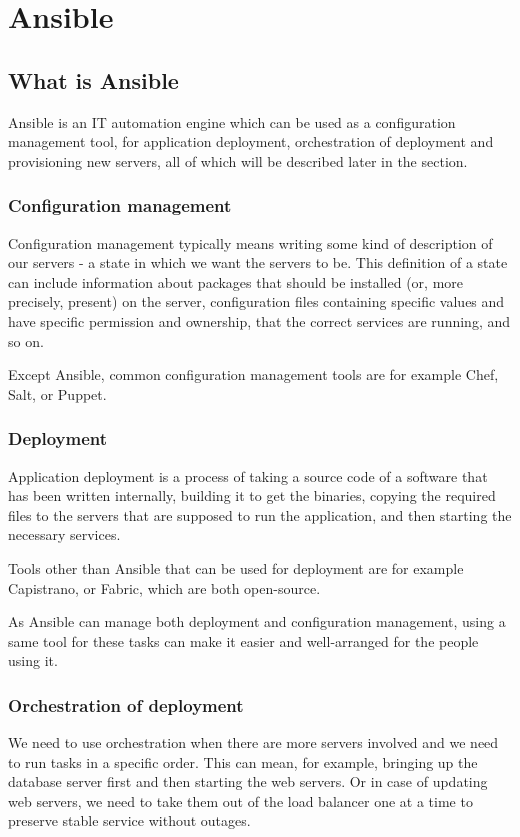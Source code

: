 \section{Ansible}

\subsection{What is Ansible}
Ansible is an IT automation engine which can be used as a configuration management tool, for application deployment, orchestration of deployment and provisioning new servers, all of which will be described later in the section. \cite{AnsibleOverview}

\subsubsection*{Configuration management}
Configuration management typically means writing some kind of description of our servers - a state in which we want the servers to be. This definition of a state can include information about packages that should be installed (or, more precisely, present) on the server, configuration files containing specific values and have specific permission and ownership, that the correct services are running, and so on.

Except Ansible, common configuration management tools are for example Chef, Salt, or Puppet.  \cite{UpAndRunning}

\subsubsection*{Deployment}
Application deployment is a process of taking a source code of a software that has been written internally, building it to get the binaries, copying the required files to the servers that are supposed to run the application, and then starting the necessary services.

Tools other than Ansible that can be used for deployment are for example Capistrano, or Fabric, which are both open-source. \cite{UpAndRunning}

As Ansible can manage both deployment and configuration management, using a same tool for these tasks can make it easier and well-arranged for the people using it.

\subsubsection*{Orchestration of deployment}
We need to use orchestration when there are more servers involved and we need to run tasks in a specific order. This can mean, for example, bringing up the database server first and then starting the web servers. Or in case of updating web servers, we need to take them out of the load balancer one at a time to preserve stable service without outages.

